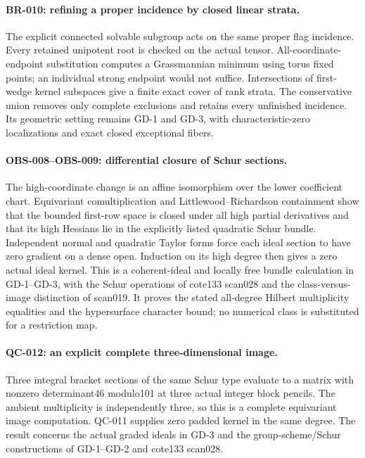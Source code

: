 \paragraph{BR-010: refining a proper incidence by closed linear strata.}
The explicit connected solvable subgroup acts on the same proper
flag incidence. Every retained unipotent root is checked on the actual
tensor. All-coordinate-endpoint substitution computes a Grassmannian
minimum using torus fixed points; an individual strong endpoint would
not suffice. Intersections of first-wedge kernel subspaces give a
finite exact cover of rank strata. The conservative union removes only
complete exclusions and retains every unfinished incidence. Its
geometric setting remains GD-1 and GD-3, with characteristic-zero
localizations and exact closed exceptional fibers.

\paragraph{OBS-008--OBS-009: differential closure of Schur sections.}
The high-coordinate change is an affine isomorphism over the lower
coefficient chart. Equivariant comultiplication and Littlewood--Richardson
containment show that the bounded first-row space is closed under all
high partial derivatives and that its high Hessians lie in the explicitly
listed quadratic Schur bundle. Independent normal and quadratic Taylor
forms force each ideal section to have zero gradient on a dense open.
Induction on its high degree then gives a zero actual ideal kernel.
This is a coherent-ideal and locally free bundle calculation in
GD-1--GD-3, with the Schur operations of cote133 scan028 and the
class-versus-image distinction of scan019. It proves the stated
all-degree Hilbert multiplicity equalities and the hypersurface
character bound; no numerical class is substituted for a restriction map.

\paragraph{QC-012: an explicit complete three-dimensional image.}
Three integral bracket sections of the same Schur type evaluate to a
matrix with nonzero determinant46 modulo101 at three actual integer
block pencils. The ambient multiplicity is independently three, so
this is a complete equivariant image computation. QC-011 supplies
zero padded kernel in the same degree. The result concerns the
actual graded ideals in GD-3 and the group-scheme/Schur constructions
of GD-1--GD-2 and cote133 scan028.

